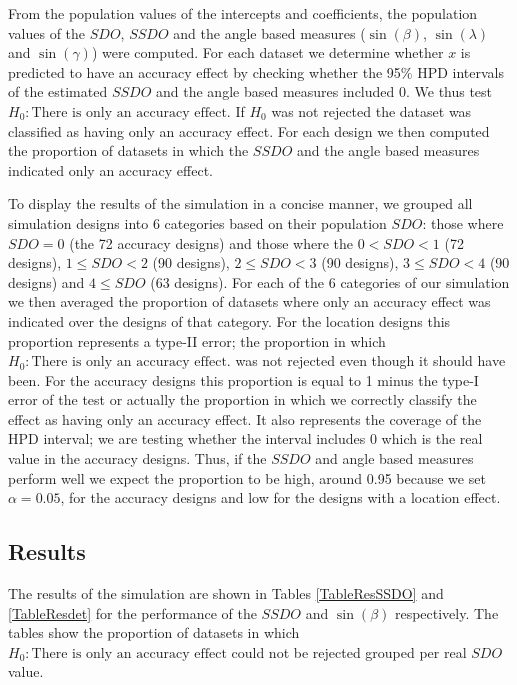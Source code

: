 \documentclass[]{interact}
\begin{document}
From the population values of the intercepts and coefficients, the population
values of the $SDO$, $SSDO$ and the angle based measures ($\sin(\beta)$,
$\sin(\lambda)$ and $\sin(\gamma)$) were computed. For each dataset we determine
whether $x$ is predicted to have an accuracy effect by checking whether the
95$\%$ HPD intervals of the estimated $SSDO$ and the angle based measures
included 0. We thus test \textit{$H_0: \text{There is only an accuracy effect}$}. If
\textit{$H_0$} was not rejected the dataset was classified as having only an accuracy
effect. For each design we then computed the proportion of datasets in which the
$SSDO$ and the angle based measures indicated only an accuracy effect.

To display the results of the simulation in a concise manner, we grouped all
simulation designs into 6 categories based on their population $SDO$: those
where $SDO = 0$ (the 72 accuracy designs) and those where the $0 < SDO < 1$ (72
designs), $1 \leq SDO < 2$ (90 designs), $2 \leq SDO < 3$ (90 designs), $3 \leq
SDO < 4$ (90 designs) and $4 \leq SDO$ (63 designs). For each of the 6
categories of our simulation we then averaged the proportion of datasets where
only an accuracy effect was indicated over the designs of that category. For the
location designs this proportion represents a type-II error; the proportion in
which \textit{$H_0: \text{There is only an accuracy effect.}$} was not rejected even
though it should have been. For the accuracy designs this proportion is equal to
1 minus the type-I error of the test or actually the proportion in which we
correctly classify the effect as having only an accuracy effect. It also
represents the coverage of the HPD interval; we are testing whether the interval
includes 0 which is the real value in the accuracy designs. Thus, if the $SSDO$
and angle based measures perform well we expect the proportion to be high,
around 0.95 because we set $\alpha = 0.05$, for the accuracy designs and low for
the designs with a location effect. 


\subsection{Results}\label{results}

The results of the simulation are shown in Tables \ref{TableResSSDO} and
\ref{TableResdet} for the performance of the $SSDO$ and $\sin(\beta)$
respectively. The tables show the proportion of datasets in which \textit{$H_0:
\text{There is only an accuracy effect}$} could not be rejected grouped per real
$SDO$ value.
\end{document}
